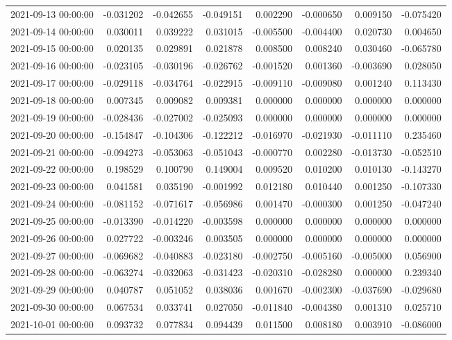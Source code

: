 \begin{tabular}{lrrrrrrr}
2021-09-13 00:00:00 & -0.031202 & -0.042655 & -0.049151 & 0.002290 & -0.000650 & 0.009150 & -0.075420 \\
2021-09-14 00:00:00 & 0.030011 & 0.039222 & 0.031015 & -0.005500 & -0.004400 & 0.020730 & 0.004650 \\
2021-09-15 00:00:00 & 0.020135 & 0.029891 & 0.021878 & 0.008500 & 0.008240 & 0.030460 & -0.065780 \\
2021-09-16 00:00:00 & -0.023105 & -0.030196 & -0.026762 & -0.001520 & 0.001360 & -0.003690 & 0.028050 \\
2021-09-17 00:00:00 & -0.029118 & -0.034764 & -0.022915 & -0.009110 & -0.009080 & 0.001240 & 0.113430 \\
2021-09-18 00:00:00 & 0.007345 & 0.009082 & 0.009381 & 0.000000 & 0.000000 & 0.000000 & 0.000000 \\
2021-09-19 00:00:00 & -0.028436 & -0.027002 & -0.025093 & 0.000000 & 0.000000 & 0.000000 & 0.000000 \\
2021-09-20 00:00:00 & -0.154847 & -0.104306 & -0.122212 & -0.016970 & -0.021930 & -0.011110 & 0.235460 \\
2021-09-21 00:00:00 & -0.094273 & -0.053063 & -0.051043 & -0.000770 & 0.002280 & -0.013730 & -0.052510 \\
2021-09-22 00:00:00 & 0.198529 & 0.100790 & 0.149004 & 0.009520 & 0.010200 & 0.010130 & -0.143270 \\
2021-09-23 00:00:00 & 0.041581 & 0.035190 & -0.001992 & 0.012180 & 0.010440 & 0.001250 & -0.107330 \\
2021-09-24 00:00:00 & -0.081152 & -0.071617 & -0.056986 & 0.001470 & -0.000300 & 0.001250 & -0.047240 \\
2021-09-25 00:00:00 & -0.013390 & -0.014220 & -0.003598 & 0.000000 & 0.000000 & 0.000000 & 0.000000 \\
2021-09-26 00:00:00 & 0.027722 & -0.003246 & 0.003505 & 0.000000 & 0.000000 & 0.000000 & 0.000000 \\
2021-09-27 00:00:00 & -0.069682 & -0.040883 & -0.023180 & -0.002750 & -0.005160 & -0.005000 & 0.056900 \\
2021-09-28 00:00:00 & -0.063274 & -0.032063 & -0.031423 & -0.020310 & -0.028280 & 0.000000 & 0.239340 \\
2021-09-29 00:00:00 & 0.040787 & 0.051052 & 0.038036 & 0.001670 & -0.002300 & -0.037690 & -0.029680 \\
2021-09-30 00:00:00 & 0.067534 & 0.033741 & 0.027050 & -0.011840 & -0.004380 & 0.001310 & 0.025710 \\
2021-10-01 00:00:00 & 0.093732 & 0.077834 & 0.094439 & 0.011500 & 0.008180 & 0.003910 & -0.086000 \\

\end{tabular}
